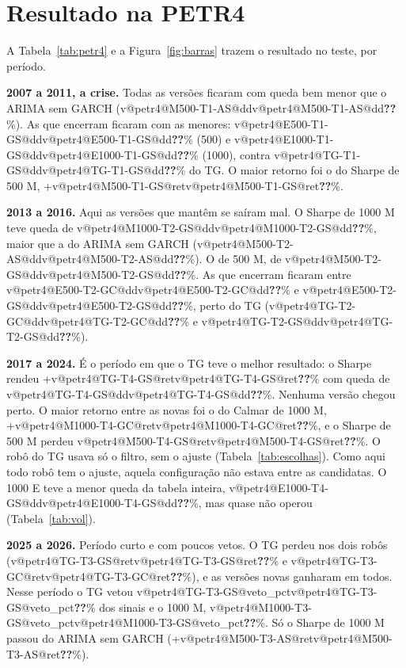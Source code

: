 \documentclass[11pt,a4paper]{article}
\makeatletter
\newcommand{\V}[3]{\ifcsname v@#1@#2@#3\endcsname\csname v@#1@#2@#3\endcsname\else\textbf{\color{red}??}\fi}
\makeatother
\begin{document}
\section{Resultado na PETR4}
\label{sec:petr4}

A Tabela~\ref{tab:petr4} e a Figura~\ref{fig:barras} trazem o resultado no teste, por período.

\textbf{2007 a 2011, a crise.} Todas as versões ficaram com queda bem menor que o ARIMA sem GARCH
(\V{petr4}{M500-T1-AS}{dd}\%). As que encerram ficaram com as menores: \V{petr4}{E500-T1-GS}{dd}\% (500) e
\V{petr4}{E1000-T1-GS}{dd}\% (1000), contra \V{petr4}{TG-T1-GS}{dd}\% do TG. O maior retorno foi o do Sharpe de
500 M, +\V{petr4}{M500-T1-GS}{ret}\%.

\textbf{2013 a 2016.} Aqui as versões que mantêm se saíram mal. O Sharpe de 1000 M teve queda de
\V{petr4}{M1000-T2-GS}{dd}\%, maior que a do ARIMA sem GARCH (\V{petr4}{M500-T2-AS}{dd}\%). O de 500 M, de
\V{petr4}{M500-T2-GS}{dd}\%. As que encerram ficaram entre \V{petr4}{E500-T2-GC}{dd}\% e
\V{petr4}{E500-T2-GS}{dd}\%, perto do TG (\V{petr4}{TG-T2-GC}{dd}\% e \V{petr4}{TG-T2-GS}{dd}\%).

\textbf{2017 a 2024.} É o período em que o TG teve o melhor resultado: o Sharpe rendeu
+\V{petr4}{TG-T4-GS}{ret}\% com queda de \V{petr4}{TG-T4-GS}{dd}\%. Nenhuma versão chegou perto. O maior retorno
entre as novas foi o do Calmar de 1000 M, +\V{petr4}{M1000-T4-GC}{ret}\%, e o Sharpe de 500 M perdeu
\V{petr4}{M500-T4-GS}{ret}\%. O robô do TG usava só o filtro, sem o ajuste (Tabela~\ref{tab:escolhas}). Como aqui
todo robô tem o ajuste, aquela configuração não estava entre as candidatas. O 1000 E teve a menor queda da tabela
inteira, \V{petr4}{E1000-T4-GS}{dd}\%, mas quase não operou (Tabela~\ref{tab:vol}).

\textbf{2025 a 2026.} Período curto e com poucos vetos. O TG perdeu nos dois robôs (\V{petr4}{TG-T3-GS}{ret}\% e
\V{petr4}{TG-T3-GC}{ret}\%), e as versões novas ganharam em todos. Nesse período o TG vetou
\V{petr4}{TG-T3-GS}{veto_pct}\% dos sinais e o 1000 M, \V{petr4}{M1000-T3-GS}{veto_pct}\%. Só o Sharpe de 1000 M
passou do ARIMA sem GARCH (+\V{petr4}{M500-T3-AS}{ret}\%).
\end{document}
